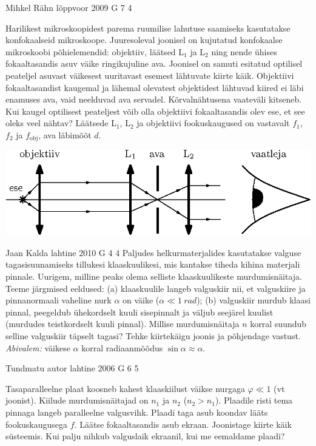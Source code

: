 \documentclass[11pt, twoside]{article}
\begin{document}
{%
{Mihkel Rähn} %
{lõppvoor} %
{2009} %
{G 7} %
{4} %
{
\ifStatement
Harilikest mikroskoopidest parema ruumilise lahutuse saamiseks kasutatakse konfokaalseid
mikroskoope. Juuresoleval joonisel on kujutatud konfokaalse mikroskoobi põhielemendid:
objektiiv, läätsed L$_1$ ja L$_2$ ning nende ühises fokaaltasandis asuv väike ringikujuline ava.
Joonisel on samuti esitatud optilisel peateljel asuvast väikesest uuritavast esemest lähtuvate
kiirte käik.
Objektiivi fokaaltasandist kaugemal ja lähemal olevatest
objektidest lähtuvad kiired ei läbi enamuses ava, vaid neelduvad ava servadel.
Kõrvalnähtusena vaateväli kitseneb. Kui kaugel optilisest peateljest
võib olla objektiivi fokaaltasandis olev ese, et see oleks veel nähtav? Läätsede L$_1$, L$_2$ ja objektiivi fookuskaugused on vastavalt $f_1$, $f_2$ ja $f_{\mathrm{obj}}$, ava läbimõõt $d$.

\begin{center}
	\includegraphics[width=0.8\linewidth]{2009-v3g-07-G_konfokaalne_mikroskoop.eps}
\end{center}
\fi
}

{Jaan Kalda} %
{lahtine} %
{2010} %
{G 4} %
{4} %
{
\ifStatement
Paljudes helkurmaterjalides kasutatakse valguse tagasisuunamiseks tillukesi
klaaskuulikesi, mis kantakse tiheda kihina materjali pinnale. Uurigem, milline
peaks olema selliste klaaskuulikeste murdumisnäitaja. Teeme järgmised eeldused:
(a) klaaskuulile langeb valguskiir nii, et valguskiire ja pinnanormaali vaheline
nurk $\alpha$ on väike ($\alpha \ll \SI{1}{rad}$); (b) valguskiir murdub klaasi
pinnal, peegeldub ühekordselt kuuli sisepinnalt ja väljub seejärel kuulist
(murdudes teistkordselt kuuli pinnal). Millise murdumisnäitaja $n$ korral
suundub selline valguskiir täpselt tagasi? Tehke kiirtekäigu joonis ja
põhjendage vastust. \emph{Abivalem:} väikese $\alpha$ korral radiaanmõõdus
$\sin\alpha \approx \alpha$.
\fi
}

{Tundmatu autor} %
{lahtine} %
{2006} %
{G 6} %
{5} %
{
\ifStatement
Tasaparalleelne plaat koosneb kahest klaaskiilust väikse nurgaga $\varphi \ll 1$ (vt joonist). Kiilude murdumisnäitajad on $n_1$ ja $n_2$ ($n_2 > n_1$). Plaadile risti tema pinnaga langeb paralleelne valgusvihk. Plaadi taga asub koondav lääts fookuskaugusega $f$. Läätse fokaaltasandis asub ekraan. Joonistage kiirte käik süsteemis. Kui palju nihkub valguslaik ekraanil, kui me eemaldame plaadi? 

}}
\end{document}
